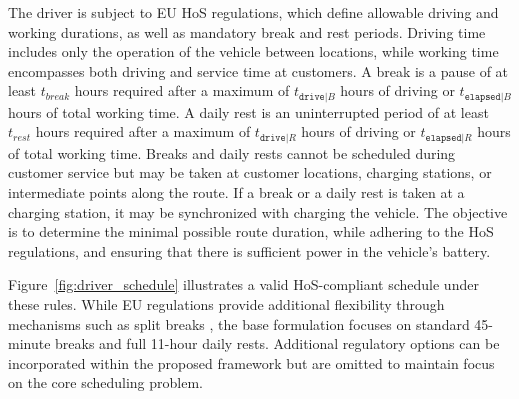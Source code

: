\documentclass[3p,11pt,authoryear]{elsarticle}  %
\begin{document}
The driver is subject to EU HoS regulations, which define allowable driving and working durations, as well as mandatory break and rest periods. Driving time includes only the operation of the vehicle between locations, while working time encompasses both driving and service time at customers. A break is a pause of at least $t_{break}$ hours required after a maximum of $t_{\texttt{drive}|B}$ hours of driving or $t_{\texttt{elapsed}|B}$ hours of total working time. A daily rest is an uninterrupted period of at least $t_{rest}$ hours required after a maximum of $t_{\texttt{drive}|R}$ hours of driving or $t_{\texttt{elapsed}|R}$ hours of total working time. 
Breaks and daily rests cannot be scheduled during customer service but may be taken at customer locations, charging stations, or intermediate points along the route. If a break or a daily rest is taken at a charging station, it may be synchronized with charging the vehicle. 
The objective is to determine the minimal possible route duration, while adhering to the HoS regulations, and ensuring that there is sufficient power in the vehicle's battery.


Figure~\ref{fig:driver_schedule} illustrates a valid HoS-compliant schedule under these rules. While EU regulations provide additional flexibility through mechanisms such as split breaks %
, the base formulation focuses on standard 45-minute breaks and full 11-hour daily rests. Additional regulatory options can be incorporated within the proposed framework but are omitted to maintain focus on the core scheduling problem. 
\end{document}
